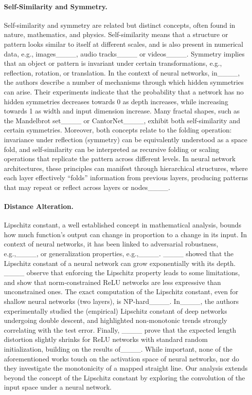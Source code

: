 \paragraph{Self-Similarity and Symmetry.} 
Self-similarity and symmetry are related but distinct concepts, often found in nature, mathematics, and physics. Self-similarity means that a structure or pattern looks similar to itself at different scales, and is also present in numerical data, e.g., images____, audio tracks____ or videos____. Symmetry implies that an object or pattern is invariant under certain transformations, e.g., reflection, rotation, or translation. In the context of neural networks, in____, the authors describe a number of mechanisms through which hidden symmetries can arise. Their experiments indicate that the probability that a network has no hidden symmetries decreases towards 0 as depth increases, while increasing towards 1 as width and input dimension increase. Many fractal shapes, such as the Mandelbrot set____ or CantorNet____, exhibit both self-similarity and certain symmetries.
Moreover, both concepts relate to the folding operation: invariance under reflection (symmetry) can be equivalently understood as a space fold, and self-similarity can be interpreted as recursive folding or scaling operations that replicate the pattern across different levels. In neural network architectures, these principles can manifest through hierarchical structures, where each layer effectively ``folds'' information from previous layers, producing patterns that may repeat or reflect across layers or nodes____.



\paragraph{Distance Alteration.}
Lipschitz constant, a well established concept in mathematical analysis,  bounds  how much function's output can change in proportion to a change in its input. 
In context of neural networks, it has been linked to adversarial robustness, e.g.,____, or generalization properties, e.g.,____. ____ showed that the Lipschitz constant of a neural network can grow exponentially with its depth.
____ observe  that enforcing the Lipschitz property leads to some limitations, and show that   norm-constrained
ReLU networks are less expressive than unconstrained ones.  The exact computation of the Lipschitz constant, even for shallow neural networks (two layers), is NP-hard____. In____, the authors experimentally studied  the (empirical) Lipschitz constant of deep networks undergoing double descent, and highlighted non-monotonic trends strongly correlating with the test error.
Finally, ____ prove that the expected length distortion slightly shrinks  for ReLU networks with standard random
initialization, building on the results of____.
While important, none of the aforementioned works touch on the activation space of neural networks, nor do they investigate the monotonicity of a mapped straight line. Our analysis extends beyond the concept of the Lipschitz constant by exploring the convolution of the input space under a neural network.